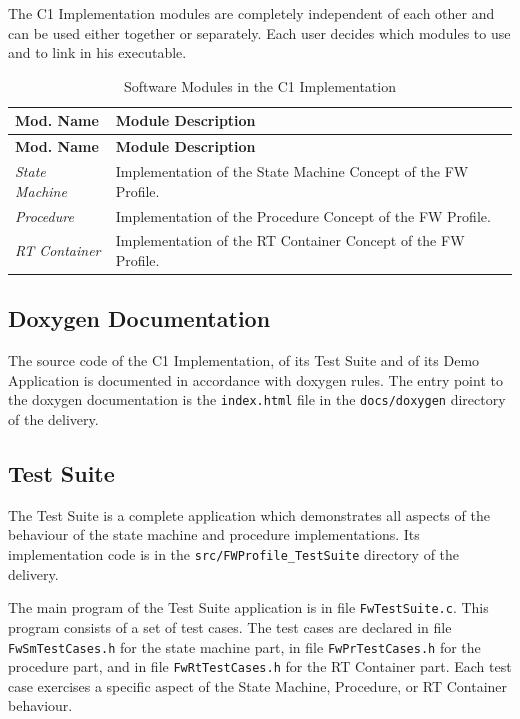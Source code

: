 \documentclass[a4paper,10pt]{article}
\begin{document}
The C1 Implementation modules are completely independent of each other and can be used either together or separately. Each user decides which modules to use and to link in his executable.

\begin{longtable}{|p{2.3cm}|p{6.4cm}|}
\caption{Software Modules in the C1 Implementation} \label{tab:swpkg}\\
\hline
\rowcolor{gray}
\textbf{Mod. Name} & \textbf{Module Description} \\
\hline\hline
\endfirsthead
\rowcolor{gray}
\textbf{Mod. Name} & \textbf{Module Description} \\
\hline\hline
\endhead
%
\emph{State Machine} & Implementation of the State Machine Concept of the FW Profile. \\
\hline
\emph{Procedure} & Implementation of the Procedure Concept of the FW Profile. \\
\hline
\emph{RT Container} & Implementation of the RT Container Concept of the FW Profile. \\
\hline
\end{longtable}

\subsection{Doxygen Documentation}\label{sec:doxygenDoc}
The source code of the C1 Implementation, of its Test Suite and of its Demo Application is documented in accordance with doxygen rules. The entry point to the doxygen documentation is the \texttt{index.html} file in the \texttt{docs/doxygen} directory of the delivery.

\subsection{Test Suite}\label{sec:testSuite}
The Test Suite is a complete application which demonstrates all aspects of the behaviour of the state machine and procedure implementations. Its implementation code is in the \texttt{src/FWProfile\_TestSuite} directory of the delivery.

The main program of the Test Suite application is in file \texttt{FwTestSuite.c}. 
This program consists of a set of test cases. 
The test cases are declared in file \texttt{FwSmTestCases.h} for the state machine part, in file \texttt{FwPrTestCases.h} for the procedure part, and in file \texttt{FwRtTestCases.h} for the RT Container part. 
Each test case exercises a specific aspect of the State Machine, Procedure, or RT Container behaviour.
\end{document}
